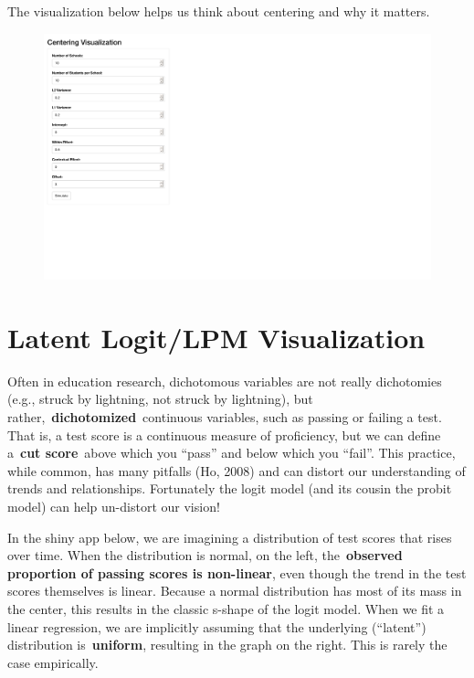 \documentclass[
  letterpaper,
  DIV=11,
  numbers=noendperiod]{scrreprt}
\begin{document}
The visualization below helps us think about centering and why it
matters.

\begin{figure}

{\centering 

\href{https://s43dnt-josh-gilbert.shinyapps.io/s43_centering_viz/}{\includegraphics{centering_viz_files/figure-pdf/unnamed-chunk-1-1.pdf}}

}

\end{figure}

\hypertarget{latent-logitlpm-visualization}{%
\chapter{Latent Logit/LPM
Visualization}\label{latent-logitlpm-visualization}}

Often in education research, dichotomous variables are not really
dichotomies (e.g., struck by lightning, not struck by lightning), but
rather,~\textbf{dichotomized}~continuous variables, such as passing or
failing a test. That is, a test score is a continuous measure of
proficiency, but we can define a~\textbf{cut score}~above which you
``pass'' and below which you ``fail''. This practice, while common, has
many pitfalls (Ho, 2008) and can distort our understanding of trends and
relationships. Fortunately the logit model (and its cousin the probit
model) can help un-distort our vision!

In the shiny app below, we are imagining a distribution of test scores
that rises over time. When the distribution is normal, on the left,
the~\textbf{observed proportion of passing scores is non-linear}, even
though the trend in the test scores themselves is linear. Because a
normal distribution has most of its mass in the center, this results in
the classic s-shape of the logit model. When we fit a linear regression,
we are implicitly assuming that the underlying (``latent'') distribution
is~\textbf{uniform}, resulting in the graph on the right. This is rarely
the case empirically.
\end{document}
